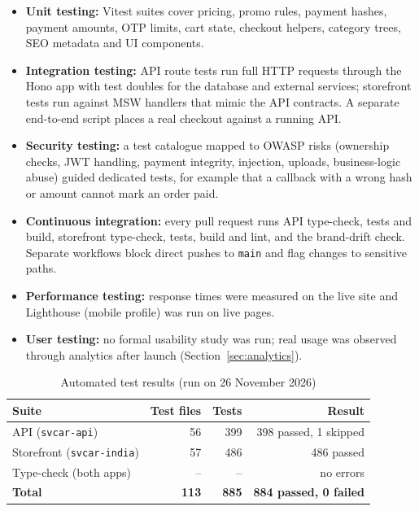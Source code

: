 \documentclass{tietreport}
\begin{document}
\begin{itemize}
  \item \textbf{Unit testing:} Vitest suites cover pricing, promo rules,
        payment hashes, payment amounts, OTP limits, cart state, checkout
        helpers, category trees, SEO metadata and UI components.
  \item \textbf{Integration testing:} API route tests run full HTTP requests
        through the Hono app with test doubles for the database and external
        services; storefront tests run against MSW handlers that mimic the
        API contracts. A separate end-to-end script places a real checkout
        against a running API.
  \item \textbf{Security testing:} a test catalogue mapped to OWASP risks
        (ownership checks, JWT handling, payment integrity, injection,
        uploads, business-logic abuse) guided dedicated tests, for example
        that a callback with a wrong hash or amount cannot mark an order paid.
  \item \textbf{Continuous integration:} every pull request runs API
        type-check, tests and build, storefront type-check, tests, build and
        lint, and the brand-drift check. Separate workflows block direct
        pushes to \texttt{main} and flag changes to sensitive paths.
  \item \textbf{Performance testing:} response times were measured on the
        live site and Lighthouse (mobile profile) was run on live pages.
  \item \textbf{User testing:} no formal usability study was run; real
        usage was observed through analytics after launch (Section~\ref{sec:analytics}).
\end{itemize}

\begin{table}[H]
\centering\small
\begin{tabular}{l r r r}
\toprule
\textbf{Suite} & \textbf{Test files} & \textbf{Tests} & \textbf{Result} \\
\midrule
API (\texttt{svcar-api}) & 56 & 399 & 398 passed, 1 skipped \\
Storefront (\texttt{svcar-india}) & 57 & 486 & 486 passed \\
Type-check (both apps) & -- & -- & no errors \\
\midrule
\textbf{Total} & \textbf{113} & \textbf{885} & \textbf{884 passed, 0 failed} \\
\bottomrule
\end{tabular}
\caption{Automated test results (run on 26 November 2026)}
\label{tab:tests}
\end{table}
\end{document}
